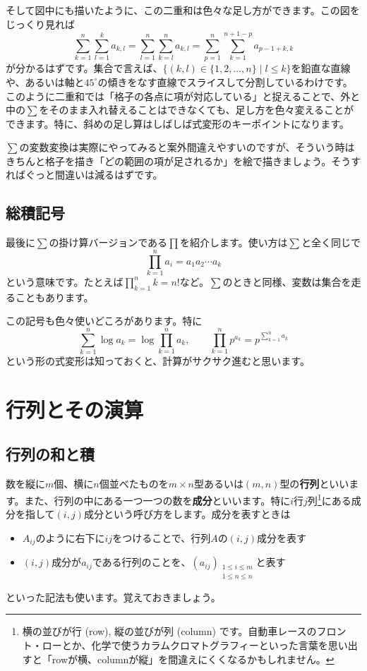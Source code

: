 そして図中にも描いたように、この二重和は色々な足し方ができます。この図をじっくり見れば
\[
\sum_{k = 1}^n \sum_{l = 1}^k a_{k, l}
= \sum_{l = 1}^n \sum_{k = l}^n a_{k, l}
= \sum_{p = 1}^n \sum_{k = 1}^{n + 1 - p} a_{p - 1 + k, k}
\]
が分かるはずです。集合で言えば、$\{(k,l)\in\{1,2,\ldots,n\} \mid l \leq k\}$を鉛直な直線や、あるいは軸と$45^{\circ}$の傾きをなす直線でスライスして分割しているわけです。このように二重和では「格子の各点に項が対応している」と捉えることで、外と中の$\sum$をそのまま入れ替えることはできなくても、足し方を色々変えることができます。特に、斜めの足し算はしばしば式変形のキーポイントになります。

$\sum$の変数変換は実際にやってみると案外間違えやすいのですが、そういう時はきちんと格子を描き「どの範囲の項が足されるか」を絵で描きましょう。そうすればぐっと間違いは減るはずです。

\subsection{総積記号}
最後に$\sum$の掛け算バージョンである$\prod$を紹介します。使い方は$\sum$と全く同じで
\[
\prod_{k = 1}^n a_i = a_1 a_2 \cdots a_k
\]
という意味です。たとえば$\prod_{k = 1}^n k = n!$など。$\sum$のときと同様、変数は集合を走ることもあります。

この記号も色々使いどころがあります。特に
\[
\sum_{k = 1}^n \log a_k = \log \prod_{k = 1}^n a_k, \qquad \prod_{k = 1}^n p^{a_k} = p^{\sum_{k = 1}^n a_k}
\]
という形の式変形は知っておくと、計算がサクサク進むと思います。

\section{行列とその演算}

\subsection{行列の和と積}
数を縦に$m$個、横に$n$個並べたものを$m\times n$型あるいは$(m, n)$型の\textbf{行列}といいます。また、行列の中にある一つ一つの数を\textbf{成分}といいます。特に$i$行$j$列\footnote{横の並びが行 (row), 縦の並びが列 (column) です。自動車レースのフロント・ローとか、化学で使うカラムクロマトグラフィーといった言葉を思い出すと「rowが横、columnが縦」を間違えにくくなるかもしれません。}にある成分を指して$(i,j)$成分という呼び方をします。成分を表すときは
\begin{itemize}
\item $A_{ij}$のように右下に$ij$をつけることで、行列$A$の$(i, j)$成分を表す
\item $(i, j)$成分が$a_{ij}$である行列のことを、$(a_{ij})_{\substack{1\leq i\leq m\\ 1\leq n\leq n}}$と表す
\end{itemize}
といった記法も使います。覚えておきましょう。

